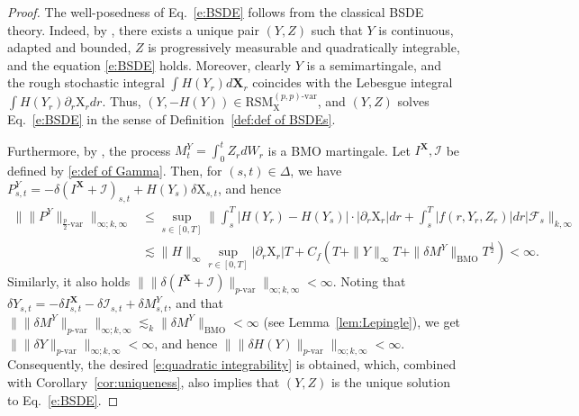 \documentclass[11pt,reqno]{amsart}
\numberwithin{equation}{section}
\begin{document}
\begin{proof}
The well-posedness of Eq.~\eqref{e:BSDE} follows from the classical BSDE theory. Indeed, by \cite[Theorem~7.3.3]{zhang2017backward}, there exists a unique pair $(Y,Z)$ such that $Y$ is continuous, adapted and bounded, $Z$ is progressively measurable and quadratically integrable, and the equation \eqref{e:BSDE} holds. Moreover, clearly $Y$ is a semimartingale, and the rough stochastic integral $\int H(Y_r) d\mathbf X_r$ coincides with the Lebesgue integral $\int H(Y_r) \partial_{r}\mathrm X_r dr$. Thus, $(Y,-H(Y)) \in \mathrm{RSM}^{(p,p)\text{-}\mathrm{var}}_{\mathrm X}$, and $(Y,Z)$ solves Eq.~\eqref{e:BSDE} in the sense of Definition~\ref{def:def of BSDEs}. 

Furthermore, by \cite[Theorem~7.2.1]{zhang2017backward}, the process $M^{Y}_t = \int_{0}^{t}Z_r dW_r$ is a \textrm{BMO} martingale. Let $I^{\mathbf X}, \mathcal I$ be defined by \eqref{e:def of Gamma}. Then, for $(s,t)\in\Delta$, we have $P^{Y}_{s,t} = - \delta (I^{\mathbf X} + \mathcal I)_{s,t} + H(Y_{s}) \delta \mathrm X_{s,t}$, and hence
\begin{equation*}
\begin{aligned}
\Big\| \|P^{Y}\|_{\frac{p}{2}\text{-}\mathrm{var}} \Big\|_{\infty;k,\infty} &\le \sup_{s\in[0,T]} \Big\| \int_{s}^{T} |H(Y_r) - H(Y_{s})| \cdot |\partial_{r}  \mathrm X_{r}| dr + \int_{s}^{T} |f(r,Y_{r},Z_{r})| dr \Big| \mathcal F_{s} \Big\|_{k,\infty} \\
&\lesssim \|H\|_{\infty} \sup_{r\in[0,T]}|\partial_{r}\mathrm X_r| T + C_{f} (T + \|Y\|_{\infty} T + \|\delta M^Y\|_{\mathrm{BMO}} T^{\frac{1}{2}}) < \infty.
\end{aligned}
\end{equation*}
Similarly, it also holds $\|\|\delta(I^{\mathbf X} + \mathcal I)\|_{p\text{-}\mathrm{var}}\|_{\infty;k,\infty} < \infty$. Noting that $\delta Y_{s,t} = - \delta I^{\mathbf X}_{s,t}  - \delta \mathcal I_{s,t} + \delta M^{Y}_{s,t}$, and that $\|\|\delta M^Y\|_{p\text{-}\mathrm{var}}\|_{\infty;k,\infty}\lesssim_k \|\delta M^Y\|_{\mathrm{BMO}} < \infty$ (see Lemma~\ref{lem:Lepingle}), we get $\|\|\delta Y\|_{p\text{-}\mathrm{var}}\|_{\infty;k,\infty} < \infty$, and hence
$
\|\|\delta H(Y)\|_{p\text{-}\mathrm{var}}\|_{\infty;k,\infty} < \infty.
$
Consequently, the desired \eqref{e:quadratic integrability} is obtained, which, combined with Corollary~\ref{cor:uniqueness}, also implies that $(Y,Z)$ is the unique solution to Eq.~\eqref{e:BSDE}. 
\end{proof}
\end{document}
